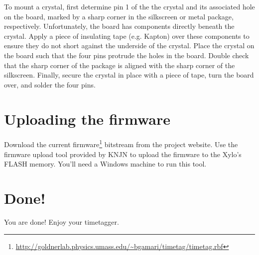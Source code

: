 To mount a crystal, first determine pin 1 of the the crystal and its
associated hole on the board, marked by a sharp corner in the
silkscreen or metal package, respectively. Unfortunately, the board
has components directly beneath the crystal. Apply a piece of
insulating tape (e.g. Kapton) over these components to ensure they do
not short against the underside of the crystal. Place the crystal on
the board such that the four pins protrude the holes in the
board. Double check that the sharp corner of the package is aligned
with the sharp corner of the silkscreen. Finally, secure the crystal
in place with a piece of tape, turn the board over, and solder the
four pins.

\section{Uploading the firmware}
\label{Sec:UploadingFirmware}

Download the current
firmware\footnote{\url{http://goldnerlab.physics.umass.edu/~bgamari/timetag/timetag.rbf}}
bitstream from the project website. Use the firmware upload tool
provided by KNJN to upload the firmware to the Xylo's FLASH
memory. You'll need a Windows machine to run this tool.


\section{Done!}
You are done! Enjoy your timetagger.

\begin{comment}
\begin{figure}
  \center
  \texttt{[image: T.jpeg]}
  \caption{T the turtle says ``Hello!''.}
  \label{fig:T}
\end{figure}
\end{comment}

